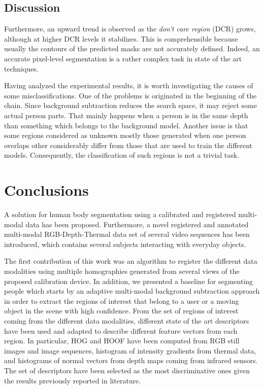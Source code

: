 \documentclass[10pt,twocolumn,letterpaper]{article}
\begin{document}
\subsection{Discussion}
\label{ssec:discussion}

Furthermore, an upward trend is observed as the \emph{don't care region} (DCR) grows, although at higher DCR levels it stabilizes. This is comprehensible because usually the contours of the predicted masks are not accurately defined. Indeed, an accurate pixel-level segmentation is a rather complex task in state of the art techniques.

Having analyzed the experimental results, it is worth investigating the causes of some
misclassifications. One of the problems is originated in the beginning of the chain. Since
background subtraction reduces the search space, it may reject some actual person parts.
That mainly happens when a person is in the same depth than something which belongs
to the background model. Another issue is that some regions considered as unknown
mostly those generated when one person overlaps other considerably differ from those
that are used to train the different models. Consequently, the classification of such regions
is not a trivial task.

\section{Conclusions}
\label{sec:conclusions}
A solution for human body segmentation using a calibrated and registered multi-modal data has been proposed. Furthermore, a novel registered and annotated multi-modal RGB-Depth-Thermal data set of several video sequences has been introduced, which contains several
subjects interacting with everyday objects.

The first contribution of this work was an algorithm to register the different data modalities using multiple homographies generated from several views of the proposed calibration device. In addition, we presented a baseline for segmenting people which starts by an adaptive multi-modal background subtraction approach in order to extract the regions of interest that belong to a user or a moving object in the scene with high confidence. From the set of regions of interest coming
from the different data modalities, different state of the art descriptors have been used
and adapted to describe different feature vectors from each region. In particular, HOG and HOOF have been computed from RGB still images and image sequences, histogram of intensity gradients from thermal data, and histograms of normal vectors from depth maps coming from infrared sensors. The set of descriptors have been selected as the most discriminative ones given the results previously reported in literature.
\end{document}
